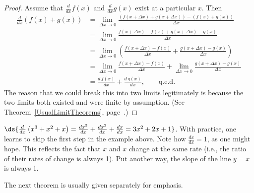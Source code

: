 \begin{proof} Assume that $\frac{d}{dx}f(x)$ and
$\frac{d}{dx}g(x)$ exist at a particular $x$.
Then
\begin{align*}
\frac{d}{dx}\left(f(x)+g(x)\right)
&=\lim_{\Delta x\to0}\frac{(f(x+\Delta x)+g(x+\Delta x))-(f(x)+g(x))}
      {\Delta x}\\
&=\lim_{\Delta x\to0}\frac{f(x+\Delta x)-f(x)+g(x+\Delta x)-g(x)}
      {\Delta x}\\
&=\lim_{\Delta x\to0}\left(\frac{f(x+\Delta x)-f(x)}{\Delta x}
      +\frac{g(x+\Delta x)-g(x)}{\Delta x}\right)\\
&=\lim_{\Delta x\to0}\frac{f(x+\Delta x)-f(x)}{\Delta x}
      +\lim_{\Delta x\to0}\frac{g(x+\Delta x)-g(x)}{\Delta x}\\
&=\frac{d\,f(x)}{dx}+\frac{d\,g(x)}{dx},\qquad\text{q.e.d.}    \end{align*}
The reason that we could break this into two limits 
legitimately is because the two limits both existed
and were finite by assumption. (See Theorem~\ref{UsualLimitTheorems},
page~\pageref{UsualLimitTheorems}.)
\end{proof}
\bex $\ds{\frac{d}{dx}\left(x^3+x^2+x\right)=
\frac{dx^3}{dx}+\frac{dx^2}{dx}+\frac{dx}{dx}=3x^2+2x+1}$.
\eex
With practice, one learns to skip the first step in the example above.
Note how $\frac{dx}{dx}=1$, as one might hope.  This reflects the
fact that $x$ and $x$ change at the same rate (i.e., the ratio of
their rates of change is always 1).  Put another way, the slope
of the line $y=x$ is always 1.

The next theorem is usually given separately for emphasis.

